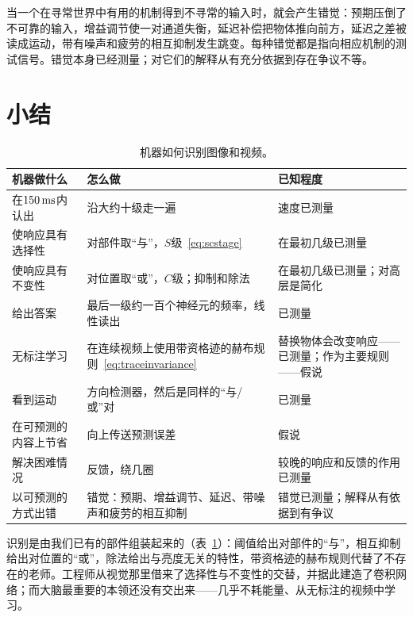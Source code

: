 \begin{keyblock}
\begin{proposition}[错觉是机制的印记]
\label{prop:illusions}
当一个在寻常世界中有用的机制得到不寻常的输入时，就会产生错觉：预期压倒了不可靠的输入，增益调节使一对通道失衡，延迟补偿把物体推向前方，延迟之差被读成运动，带有噪声和疲劳的相互抑制发生跳变。每种错觉都是指向相应机制的测试信号。错觉本身已经测量；对它们的解释从有充分依据到存在争议不等。
\end{proposition}
\end{keyblock}

\section{小结}

\begin{table}[t]
\centering
\footnotesize
\setlength{\tabcolsep}{4pt}
\renewcommand{\arraystretch}{1.15}
\begin{tabular}{>{\raggedright}p{3.0cm}>{\raggedright}p{4.6cm}>{\raggedright\arraybackslash}p{5.2cm}}
\toprule
机器做什么 & 怎么做 & 已知程度 \\
\midrule
在$150\,\text{ms}$内认出 & 沿大约十级走一遍 & 速度已测量 \\
使响应具有选择性 & 对部件取“与”，$S$级~\eqref{eq:scstage} & 在最初几级已测量 \\
使响应具有不变性 & 对位置取“或”，$C$级；抑制和除法 & 在最初几级已测量；对高层是简化 \\
给出答案 & 最后一级约一百个神经元的频率，线性读出 & 已测量 \\
无标注学习 & 在连续视频上使用带资格迹的赫布规则~\eqref{eq:traceinvariance} & 替换物体会改变响应——已测量；作为主要规则——假说 \\
看到运动 & 方向检测器，然后是同样的“与/或”对 & 已测量 \\
在可预测的内容上节省 & 向上传送预测误差 & 假说 \\
解决困难情况 & 反馈，绕几圈 & 较晚的响应和反馈的作用已测量 \\
以可预测的方式出错 & 错觉：预期、增益调节、延迟、带噪声和疲劳的相互抑制 & 错觉已测量；解释从有依据到有争议 \\
\bottomrule
\end{tabular}
\caption{机器如何识别图像和视频。}
\label{tab:recognition}
\end{table}

识别是由我们已有的部件组装起来的（表~\ref{tab:recognition}）：阈值给出对部件的“与”，相互抑制给出对位置的“或”，除法给出与亮度无关的特性，带资格迹的赫布规则代替了不存在的老师。工程师从视觉那里借来了选择性与不变性的交替，并据此建造了卷积网络；而大脑最重要的本领还没有交出来——几乎不耗能量、从无标注的视频中学习。

